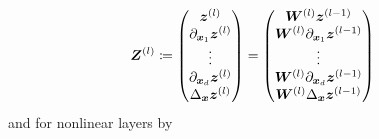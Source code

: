 \begin{align}
  \mZ^{(l)}\coloneqq %
  \begin{pmatrix}
    \vz^{(l)}
    \\
    \partial_{\vx_1} \vz^{(l)}
    \\
    \vdots
    \\
    \partial_{\vx_d} \vz^{(l)}
    \\
    \Delta_\vx\vz^{(l)}
  \end{pmatrix}
  & =
    \begin{pmatrix}
    \mW^{(l)}\vz^{(l-1)}
    \\
    \mW^{(l)}\partial_{\vx_1} \vz^{(l-1)}
    \\
    \vdots
    \\
    \mW^{(l)}\partial_{\vx_d} \vz^{(l-1)}
    \\
    \mW^{(l)}\Delta_\vx\vz^{(l-1)}
  \end{pmatrix}
    \label{eq:forward-laplacian-linear-layer-compact}
\end{align}
and for nonlinear layers by
